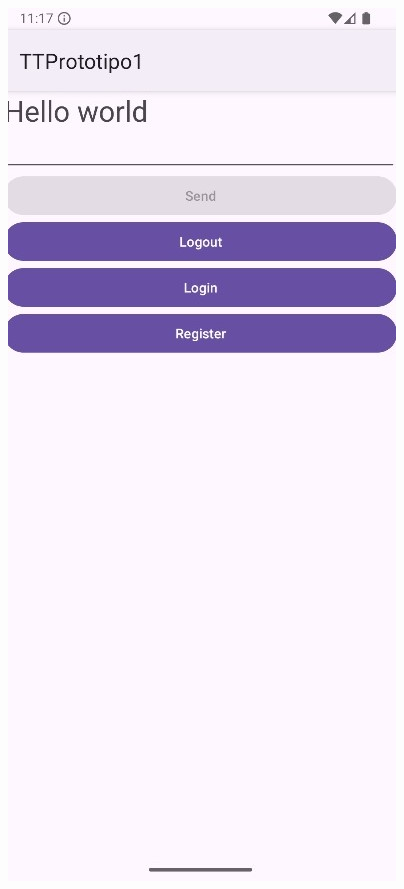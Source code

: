 \documentclass[a4paper,openright,12pt]{article}
\begin{document}
\begin{figure}[htp]
    \centering
    \begin{minipage}{0.45\textwidth}
        \centering
        \includegraphics[width=\textwidth]{Images/Vista_It1.jpg}

\end{minipage}
\end{figure}
\end{document}
